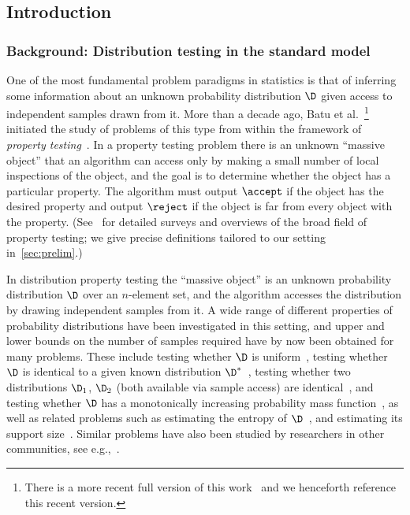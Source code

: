 \subsection{Introduction}

\subsubsection{Background: Distribution testing in the standard model}

One of the most fundamental problem paradigms in statistics is that of
inferring some information about an unknown probability distribution
$\D$ given access to independent samples drawn from it. More than a
decade ago,
Batu et al.~\cite{BFRSW:00}\footnote{There is a more recent full version of
 this work~\cite{BFRSW:10} and we henceforth reference this recent version.}
initiated the study of problems of this type
from within the framework of \emph{property testing}~\cite{RS:96,GGR:98}.
In a property testing problem
there is an unknown ``massive object'' that an algorithm can access
only by making a small number of local inspections of the object,
and the goal is to determine whether the object has a
particular property.  The algorithm must output $\accept$ if the object
has the desired property and output $\reject$ if the object is far from
every object with the property.
          (See~\cite{Fischer:01,Ron:08,Ron:10,Goldreich:10} for detailed surveys and overviews of the broad field of property testing;
we give precise definitions tailored to our setting in~\cref{sec:prelim}.)

In distribution property testing the ``massive object'' is an unknown
probability distribution $\D$ over
an $n$-element set, and the algorithm accesses the distribution by drawing
independent samples from it.
A wide range of different properties of
probability distributions have been investigated in this setting,
and upper and lower bounds on the number of samples required have by now
been obtained for many problems.  These include testing whether $\D$ is
uniform~\cite{GRexp:00,BFRSW:10,Paninski:08}, testing whether $\D$ is identical to a given known
distribution $\D^\ast$~\cite{BFFKRW:01}, testing whether two distributions $\D_1$, $\D_2$
(both available via sample access) are identical~\cite{BFRSW:00,Valiant:11}, and
testing whether $\D$ has a monotonically increasing probability mass function~\cite{BFRV:11},
       as well as related problems such as estimating the entropy of $\D$~\cite{BDKR:05,ValiantValiant:11},
and estimating its support size~\cite{RRSS:09,Valiant:11,ValiantValiant:11}. Similar problems have also been studied by
researchers in other communities, see e.g.,~\cite{Ma:81:Physics,Paninski:04,Paninski:08}.

